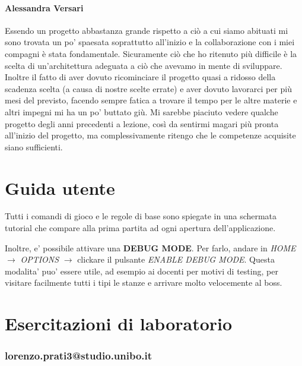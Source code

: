 \documentclass[a4paper,12pt]{report}
\begin{document}
\subsubsection{Alessandra Versari}
Essendo un progetto abbastanza grande rispetto a ciò a cui siamo abituati mi sono trovata un po' spaesata soprattutto all'inizio e la collaborazione con i miei compagni è stata fondamentale. Sicuramente ciò che ho ritenuto più difficile è la scelta di un'architettura adeguata a ciò che avevamo in mente di sviluppare.
Inoltre il fatto di aver dovuto ricominciare il progetto quasi a ridosso della scadenza scelta (a causa di nostre scelte errate) e aver dovuto lavorarci per più mesi del previsto, facendo sempre fatica a trovare il tempo per le altre materie e altri impegni mi ha un po' buttato giù.
Mi sarebbe piaciuto vedere qualche progetto degli anni precedenti a lezione, così da sentirmi magari più pronta all'inizio del progetto, ma complessivamente ritengo che le competenze acquisite siano sufficienti.

\chapter{Guida utente}
Tutti i comandi di gioco e le regole di base sono spiegate in una schermata tutorial che compare alla prima partita ad ogni apertura dell'applicazione.

Inoltre, e' possibile attivare una \textbf{DEBUG MODE}. Per farlo, andare in \textit{HOME} $\rightarrow$ \textit{OPTIONS} $\rightarrow$ clickare il pulsante \textit{ENABLE DEBUG MODE}. Questa modalita' puo' essere utile, ad esempio ai docenti per motivi di testing, per visitare facilmente tutti i tipi le stanze e arrivare molto velocemente al boss.

\chapter{Esercitazioni di laboratorio}

\subsection{lorenzo.prati3@studio.unibo.it}
\end{document}
